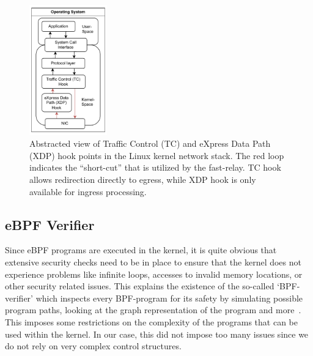 \begin{figure}[htbp]
    \centering
    \includegraphics[width=0.3\textwidth]{figures/02_background/hook-point-locations.drawio.pdf}
    \caption[Hook points within network stack]{Abstracted view of Traffic Control (TC) and eXpress Data Path (XDP) hook points
    in the Linux kernel network stack.
    The red loop indicates the ``short-cut'' that is utilized by the fast-relay.
    TC hook allows redirection directly to egress, while XDP hook is only available
    for ingress processing.
    }\label{fig:ebpf-hooks}
\end{figure}


\subsection{eBPF Verifier}
Since eBPF programs are executed in the kernel, it is quite obvious that extensive
security checks need to be in place to ensure that the kernel does not experience 
problems like infinite loops, accesses to invalid memory locations, or other security 
related issues.
This explains the existence of the so-called `BPF-verifier' which inspects 
every BPF-program for its safety by simulating possible program paths, 
looking at the graph representation of the program and more~\parencite{ebpf-verifier}.
This imposes some restrictions on the complexity of the programs that can be 
used within the kernel.
In our case, this did not impose too many issues since we do not rely on 
very complex control structures.

